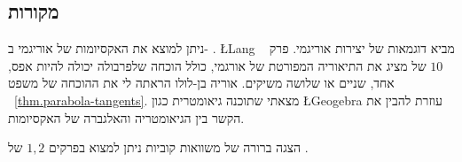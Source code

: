 \subsection*{מקורות}

ניתן למוצא את האקסיומות של אוריגמי ב-%
\cite{wiki:hh-axioms}.
\L{Lang}
\cite{lang}
מביא דוגמאות של יצירות אוריגמי. פרק%
~$10$
של
\cite{martin}
מציג את התיאוריה המפורטת של אורגמי, כולל הוכחה שלפרבולה יכולה להיות אפס, אחד, שניים או שלושה משיקים. אוריה בן-לולו הראתה לי את ההוכחה של משפט%
~\ref{thm.parabola-tangents}.
מצאתי שתוכנה גיאומטרית כגון 
\L{Geogebra}
עוזרת להבין את הקשר בין הגיאומטריה והאלגברה של האקסיומות.

הצגה ברורה של משוואות קוביות ניתן למצוא בפרקים
$1,2$
של
\cite{jorg}.
